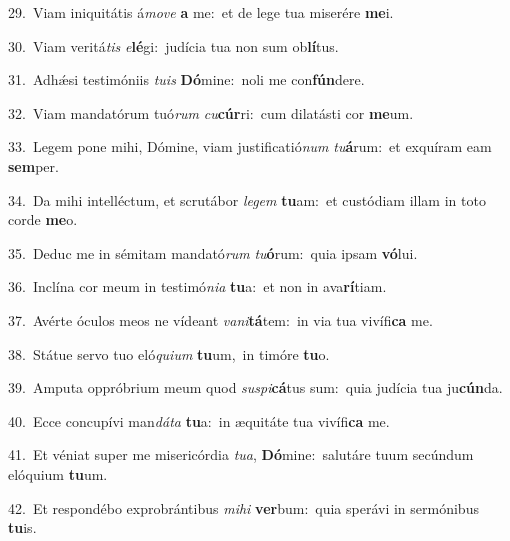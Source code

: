 {\numbfont\textcolor{\numbcolor}{29.}}~Viam iniquitátis á\-\textit{mo}\-\textit{ve} \textbf{a} me:~\star et de lege tua miserére \textbf{me}\-i.\par
{\numbfont\textcolor{\numbcolor}{30.}}~Viam veritá\textit{tis} \textit{e}\-\textbf{lé}gi:~\star judícia tua non sum ob\-\textbf{lí}\-tus.\par
{\numbfont\textcolor{\numbcolor}{31.}}~Adhǽsi testimóniis \textit{tu}\-\textit{is} \textbf{Dó}\-mine:~\star noli me con\-\textbf{fún}\-dere.\par
{\numbfont\textcolor{\numbcolor}{32.}}~Viam mandatórum tuó\textit{rum} \textit{cu}\-\textbf{cúr}ri:~\star cum dilatásti cor \textbf{me}\-um.\par
{\numbfont\textcolor{\numbcolor}{33.}}~Legem pone mihi, Dómine, viam justificatió\textit{num} \textit{tu}\-\textbf{á}rum:~\star et exquíram eam \textbf{sem}\-per.\par
{\numbfont\textcolor{\numbcolor}{34.}}~Da mihi intelléctum, et scrutábor \textit{le}\-\textit{gem} \textbf{tu}\-am:~\star et custódiam illam in toto corde \textbf{me}\-o.\par
{\numbfont\textcolor{\numbcolor}{35.}}~Deduc me in sémitam mandató\textit{rum} \textit{tu}\-\textbf{ó}rum:~\star quia ipsam \textbf{vó}\-lui.\par
{\numbfont\textcolor{\numbcolor}{36.}}~Inclína cor meum in testimó\-\textit{ni}\-\textit{a} \textbf{tu}\-a:~\star et non in ava\-\textbf{rí}\-tiam.\par
{\numbfont\textcolor{\numbcolor}{37.}}~Avérte óculos meos ne vídeant \textit{va}\-\textit{ni}\textbf{tá}tem:~\star in via tua vivífi\textbf{ca} me.\par
{\numbfont\textcolor{\numbcolor}{38.}}~Státue servo tuo eló\-\textit{qui}\-\textit{um} \textbf{tu}\-um,~\star in timóre \textbf{tu}\-o.\par
{\numbfont\textcolor{\numbcolor}{39.}}~Amputa oppróbrium meum quod \textit{su}\-\textit{spi}\textbf{cá}tus sum:~\star quia judícia tua ju\-\textbf{cún}\-da.\par
{\numbfont\textcolor{\numbcolor}{40.}}~Ecce concupívi man\-\textit{dá}\-\textit{ta} \textbf{tu}\-a:~\star in æquitáte tua vivífi\textbf{ca} me.\par
{\numbfont\textcolor{\numbcolor}{41.}}~Et véniat super me misericórdia \textit{tu}\-\textit{a}, \textbf{Dó}\-mine:~\star salutáre tuum secúndum elóquium \textbf{tu}\-um.\par
{\numbfont\textcolor{\numbcolor}{42.}}~Et respondébo exprobrántibus \textit{mi}\-\textit{hi} \textbf{ver}\-bum:~\star quia sperávi in sermónibus \textbf{tu}\-is.\par

